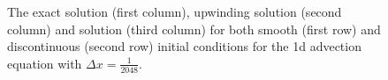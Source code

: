 \begin{figure}[!tbh]
     \caption{The exact solution (first column), upwinding solution (second column) and \protect{\lw} solution (third column) for both smooth (first row) and discontinuous (second row) initial conditions for the 1d advection equation with $\Delta x = \frac{1}{2048}$.}
   \label{fig:sol}
\end{figure} 
   
   
   
   
   
